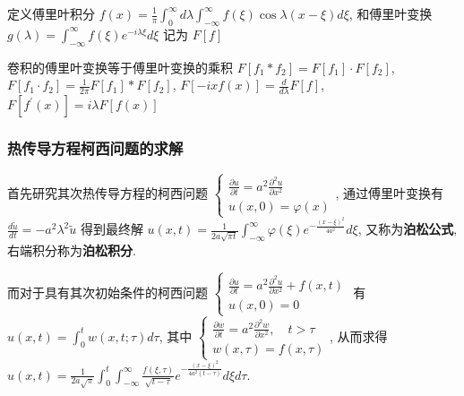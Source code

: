 \documentclass[10pt]{yerbaformat}
\begin{document}
\par 定义傅里叶积分 $f(x)=\frac{1}{\pi} \int_{0}^{\infty} d \lambda \int_{-\infty}^{\infty} f(\xi) \cos \lambda(x-\xi) d \xi$, 和傅里叶变换 $g(\lambda)=\int_{-\infty}^{\infty} f(\xi) e^{-i \lambda \xi} d \xi$ 记为 $F[f]$

\begin{lemma}
    卷积的傅里叶变换等于傅里叶变换的乘积 $F\left[f_{1} * f_{2}\right]=F\left[f_{1}\right] \cdot F\left[f_{2}\right]$, $F\left[f_{1} \cdot f_{2}\right]=\frac{1}{2 \pi} F\left[f_{1}\right] * F\left[f_{2}\right]$, $F[-i x f(x)]=\frac{d}{d \lambda} F[f]$, $F\left[f^{\prime}(x)\right]=i \lambda F[f(x)]$
\end{lemma}

\subsubsection{热传导方程柯西问题的求解} 

\par 首先研究其次热传导方程的柯西问题 $\left\{\begin{array}{l}\frac{\partial u}{\partial t}=a^{2} \frac{\partial^{2} u}{\partial x^{2}} \\ u(x, 0)=\varphi(x)\end{array}\right.$, 通过傅里叶变换有 $\frac{d \tilde{u}}{d t}=-a^{2} \lambda^{2} \tilde{u}$ 得到最终解 $u(x, t)=\frac{1}{2 a \sqrt{\pi t}} \int_{-\infty}^{\infty} \varphi(\xi) e^{-\frac{(x-\xi)^{2}}{4 a^{2}}} d \xi$, 又称为\textbf{泊松公式}, 右端积分称为\textbf{泊松积分}.

\par 而对于具有其次初始条件的柯西问题 $\left\{\begin{array}{l}\frac{\partial u}{\partial t}=a^{2} \frac{\partial^{2} u}{\partial x^{2}}+f(x, t) \\ u(x, 0)=0\end{array}\right.$ 有 $u(x, t)=\int_{0}^{t} w(x, t ; \tau) d \tau$, 其中 $\left\{\begin{array}{l}\frac{\partial w}{\partial t}=a^{2} \frac{\partial^{2} w}{\partial x^{2}}, \quad t>\tau \\ w(x, \tau)=f(x, \tau)\end{array}\right.$, 从而求得 $u(x, t)=\frac{1}{2 a \sqrt{\pi}} \int_{0}^{t} \int_{-\infty}^{\infty} \frac{f(\xi, \tau)}{\sqrt{t-\tau}} e^{-\frac{(x-\xi)^{2}}{4 a^{2}(t-\tau)}} d \xi d \tau$.

\end{document}
